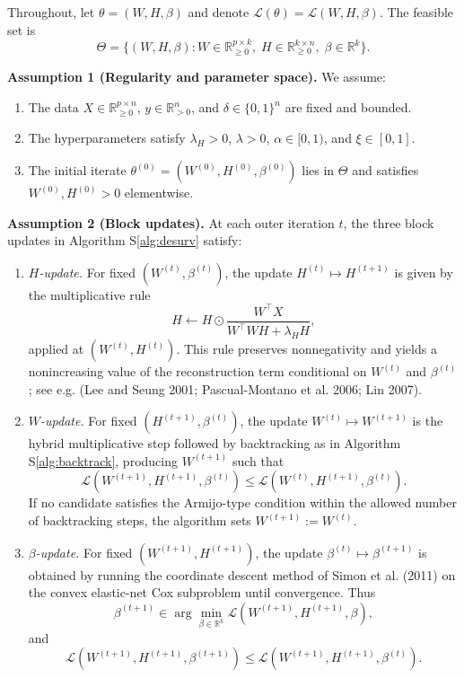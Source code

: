 \documentclass[
]{article}
\begin{document}
Throughout, let \(\theta = (W,H,\beta)\) and denote
\(\mathcal{L}(\theta) = \mathcal{L}(W,H,\beta)\). The feasible set is \[
\Theta = \{(W,H,\beta):
  W \in \mathbb{R}_{\ge 0}^{p\times k},\;
  H \in \mathbb{R}_{\ge 0}^{k\times n},\;
  \beta \in \mathbb{R}^k\}.
\]

\textbf{Assumption 1 (Regularity and parameter space).} We assume:

\begin{enumerate}[label=(\roman*)]
  \item The data $X \in \mathbb{R}_{\ge 0}^{p\times n}$, $y \in \mathbb{R}^n_{>0}$, and $\delta \in \{0,1\}^n$ are fixed and bounded.
  \item The hyperparameters satisfy $\lambda_H > 0$, $\lambda>0$, $\alpha \in [0,1)$, and $\xi \in [0,1]$.
  \item The initial iterate $\theta^{(0)} = (W^{(0)},H^{(0)},\beta^{(0)})$ lies in $\Theta$ and satisfies $W^{(0)},H^{(0)} > 0$ elementwise.
\end{enumerate}

\textbf{Assumption 2 (Block updates).} At each outer iteration \(t\),
the three block updates in Algorithm S\ref{alg:desurv} satisfy:

\begin{enumerate}[label=(\roman*)]
  \item \emph{$H$-update.} For fixed $(W^{(t)},\beta^{(t)})$, the update
        $H^{(t)} \mapsto H^{(t+1)}$ is given by the multiplicative rule
        \[
        H \leftarrow H \odot \frac{W^\top X}{W^\top W H + \lambda_H H},
        \]
        applied at $(W^{(t)},H^{(t)})$. This rule preserves nonnegativity and
        yields a nonincreasing value of the reconstruction term conditional on
        $W^{(t)}$ and $\beta^{(t)}$; see e.g.
        (Lee and Seung 2001; Pascual-Montano et al. 2006; Lin 2007).
  \item \emph{$W$-update.} For fixed $(H^{(t+1)},\beta^{(t)})$, the update
        $W^{(t)} \mapsto W^{(t+1)}$ is the hybrid multiplicative step
        followed by backtracking as in Algorithm S\ref{alg:backtrack}, producing
        $W^{(t+1)}$ such that
        \[
          \mathcal{L}(W^{(t+1)},H^{(t+1)},\beta^{(t)})
          \le
          \mathcal{L}(W^{(t)},H^{(t+1)},\beta^{(t)}).
        \]
        If no candidate satisfies the Armijo-type condition within the allowed
        number of backtracking steps, the algorithm sets
        $W^{(t+1)} := W^{(t)}$.
  \item \emph{$\beta$-update.} For fixed $(W^{(t+1)},H^{(t+1)})$, the update
        $\beta^{(t)} \mapsto \beta^{(t+1)}$ is obtained by running the
        coordinate descent method of Simon et al. (2011) on the convex elastic-net Cox
        subproblem until convergence. Thus
        \[
          \beta^{(t+1)} \in
          \arg\min_{\beta\in\mathbb{R}^k}
          \mathcal{L}(W^{(t+1)},H^{(t+1)},\beta),
        \]
        and
        \[
          \mathcal{L}(W^{(t+1)},H^{(t+1)},\beta^{(t+1)})
          \le
          \mathcal{L}(W^{(t+1)},H^{(t+1)},\beta^{(t)}).
        \]
\end{enumerate}
\end{document}

